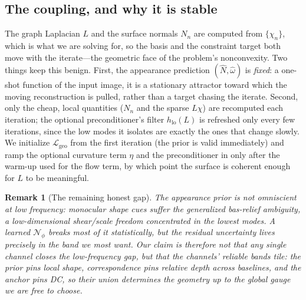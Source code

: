 \documentclass{article}
\newtheorem{remark}[theorem]{Remark}
\begin{document}
\subsection{The coupling, and why it is stable}

The graph Laplacian $L$ and the surface normals $N_n$ are computed from
$\{\chi_n\}$, which is what we are solving for, so the basis and the
constraint target both move with the iterate---the geometric face of the
problem's nonconvexity. Two things keep this benign. First, the appearance
prediction $(\hat N,\hat\omega)$ is \emph{fixed}: a one-shot function of the
input image, it is a stationary attractor toward which the moving
reconstruction is pulled, rather than a target chasing the iterate. Second,
only the cheap, local quantities ($N_n$ and the sparse $L\chi$) are recomputed
each iteration; the optional preconditioner's filter $h_{\mathrm{lo}}(L)$ is
refreshed only every few iterations, since the low modes it isolates are
exactly the ones that change slowly. We initialize $\mathcal L_{\mathrm{geo}}$
from the first iteration (the prior is valid immediately) and ramp the
optional curvature term $\eta$ and the preconditioner in only after the
warm-up used for the flow term, by which point the surface is coherent enough
for $L$ to be meaningful.

\begin{remark}[The remaining honest gap]
The appearance prior is not omniscient at low frequency: monocular shape cues
suffer the generalized bas-relief ambiguity, a low-dimensional shear/scale
freedom concentrated in the lowest modes. A learned $\mathcal N_\phi$ breaks
most of it statistically, but the residual uncertainty lives precisely in the
band we most want. Our claim is therefore not that any single channel closes
the low-frequency gap, but that the channels' reliable bands tile: the prior
pins local shape, correspondence pins relative depth across baselines, and the
anchor pins DC, so their union determines the geometry up to the global gauge
we are free to choose.
\end{remark}
\newpage



\end{document}
